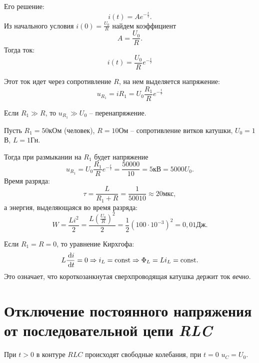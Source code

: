 	Его решение:
	\[
        i(t) = Ae^{-\frac{t}{\tau}}.
    \]
	Из начального условия \( i(0) = \frac{U_0}{R} \) найдем коэффициент
    \[
        A = \frac{U_0}{R}.
    \]
	Тогда ток:
	\begin{equation}
		i(t) = \frac{U_0}{R}e^{-\frac{t}{\tau}}
	\end{equation}
	
	Этот ток идет через сопротивление \( R \), на нем выделяется напряжение:
	\begin{equation}
		u_{R_1} = iR_1 = U_0\frac{R_1}{R}e^{-\frac{t}{\tau}}
	\end{equation}
	
	Если \( R_1 \gg R \), то \( u_{R_1} \gg U_0 \) -- перенапряжение.
	
	\begin{example}
        Пусть \( R_1 = 50 \)кОм (человек), \( R = 10 \)Ом -- сопротивление
        витков катушки, \( U_0 = 1 \)В, \( L = 1 \)Гн.
    \end{example}
    \begin{solution}
        Тогда при размыкании на \( R_1 \) будет напряжение
        \[
            u_{R_1} = U_0\frac{R_1}{R}e^{-\frac{t}{\tau}} = \frac{50000}{10} =
            5 \text{кВ} = 5000 U_0.
        \]
        Время разряда:
        \[
            \tau = \frac{L}{R_1 + R} = \frac{1}{50010} \approx 20 \text{мкс},
        \]
        а энергия, выделяющаяся во время разряда:
        \[
            W = \frac{Li^2}{2} = \frac{L\left(\frac{U_0}{R}\right)^2}{2} =
            \frac{1}{2}(100\cdot10^{-3})^2 = 0,01 \text{Дж}.
        \]
	       
    \end{solution}

	\begin{remark}
        Если \( R_1 = R = 0 \), то уравнение Кирхгофа:
        \[
            L\frac{\,\mathrm{d} i}{\,\mathrm{d} t} = 0 \Rightarrow i_L = \mathrm{const} \Rightarrow
            \Phi_L = Li_L = \mathrm{const}.
        \]
        Это означает, что короткозанкнутая сверхпроводящая катушка держит ток
        \textit{вечно}.
	\end{remark}
	
\section{Отключение постоянного напряжения от последовательной цепи \textit{RLC}}

	При \( t > 0 \) в контуре \( RLC \) происходят свободные колебания, при
    \( t = 0 \) \( u_C = U_0 \).
	
